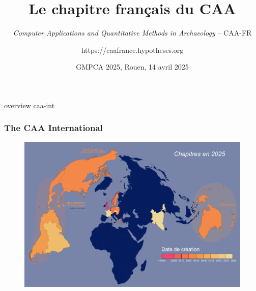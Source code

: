 \documentclass[t,aspectratio=169,xcolor=dvipsnames]{beamer}
\title[short title]{Le chapitre français du CAA}
\subtitle{\textit{Computer Applications and Quantitative Methods in Archaeology} -- CAA-FR}
\author{https://caafrance.hypotheses.org}
\date{\textcolor{nyublue}{GMPCA 2025, Rouen, 14 avril 2025}}
\begin{document}
\begin{frame}[plain]

    \titlepage
    
\end{frame}



    



\begin{frame}{overview caa-int}

    \frametitle{The CAA International} 

    \vspace{0.5mm}

    \begin{figure}
        \includegraphics[height=0.8\textheight]{figures/national-chapters_2025.pdf}
    \end{figure}

\end{frame}
\end{document}
